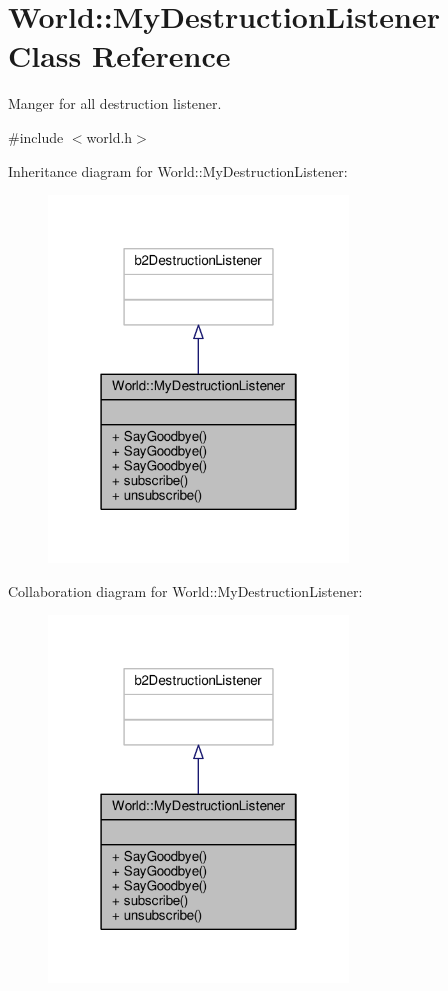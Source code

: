 \hypertarget{classWorld_1_1MyDestructionListener}{}\section{World\+:\+:My\+Destruction\+Listener Class Reference}
\label{classWorld_1_1MyDestructionListener}


Manger for all destruction listener.  




{\ttfamily \#include $<$world.\+h$>$}



Inheritance diagram for World\+:\+:My\+Destruction\+Listener\+:\nopagebreak
\begin{figure}[H]
\begin{center}
\leavevmode
\includegraphics[width=226pt]{classWorld_1_1MyDestructionListener__inherit__graph}
\end{center}
\end{figure}


Collaboration diagram for World\+:\+:My\+Destruction\+Listener\+:\nopagebreak
\begin{figure}[H]
\begin{center}
\leavevmode
\includegraphics[width=226pt]{classWorld_1_1MyDestructionListener__coll__graph}
\end{center}
\end{figure}
